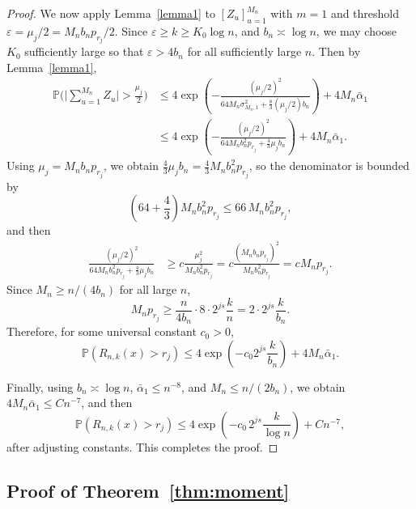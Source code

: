 \documentclass[12pt]{article}
\theoremstyle{definition}
\begin{document}
\begin{proof}
We now apply Lemma~\ref{lemma1} to \([Z_u]_{u=1}^{M_n}\) with \(m=1\) and threshold $\varepsilon=\mu_j/2=M_n b_n p_{r_j}/2$. Since $\varepsilon\ge k\ge K_0\log n$, and \(b_n\asymp \log n\), we may choose \(K_0\) sufficiently large so that $\varepsilon>4b_n$ for all sufficiently large $n$. Then by Lemma~\ref{lemma1},
\begin{align*}
\mathbb P\Big(\Big|\sum_{u=1}^{M_n}Z_u\Big|>\frac{\mu_j}{2}\Big)
&\le
4\exp \left(
-\frac{(\mu_j/2)^2}
{64 M_n \sigma_{M_n,1}^2 + \frac83(\mu_j/2)b_n}
\right)
+4M_n\bar\alpha_1 \\
&\le
4\exp \left(
-\frac{(\mu_j/2)^2}
{64 M_n b_n^2 p_{r_j} + \frac43 \mu_j b_n}
\right)
+4M_n\bar\alpha_1.
\end{align*}
Using \(\mu_j=M_n b_n p_{r_j}\), we obtain $\frac43 \mu_j b_n
=
\frac43 M_n b_n^2 p_{r_j}$, so the denominator is bounded by
\[
\left(64+\frac43\right)M_n b_n^2 p_{r_j}
\le 66\,M_n b_n^2 p_{r_j},
\]
and then
\begin{align*}
\frac{(\mu_j/2)^2}
{64 M_n b_n^2 p_{r_j} + \frac43 \mu_j b_n}
&\ge
c\frac{\mu_j^2}{M_n b_n^2 p_{r_j}} =
c\frac{(M_n b_n p_{r_j})^2}{M_n b_n^2 p_{r_j}} =
c M_n p_{r_j}.
\end{align*}
Since \(M_n\ge n/(4b_n)\) for all large $n$,
\[
M_n p_{r_j}
\ge
\frac{n}{4b_n}\cdot 8\cdot2^{js}\frac{k}{n}
=
2\cdot2^{js}\frac{k}{b_n}.
\]
Therefore, for some universal constant \(c_0>0\),
\[
\mathbb P(R_{n,k}(x)>r_j)
\le
4\exp \left(-c_0 2^{js}\frac{k}{b_n}\right)
+
4M_n\bar\alpha_1.
\]

Finally, using \(b_n\asymp \log n\), \(\bar\alpha_1\le n^{-8}\), and \(M_n\le n/(2b_n)\), we obtain $4M_n\bar\alpha_1 \le C n^{-7}$, and then
\[
\mathbb P(R_{n,k}(x)>r_j)
\le
4\exp \left(-c_0\,2^{js}\frac{k}{\log n}\right)
+
C n^{-7},
\]
after adjusting constants. This completes the proof.
\end{proof}


\subsection{Proof of Theorem~\ref{thm:moment}}
\end{document}
